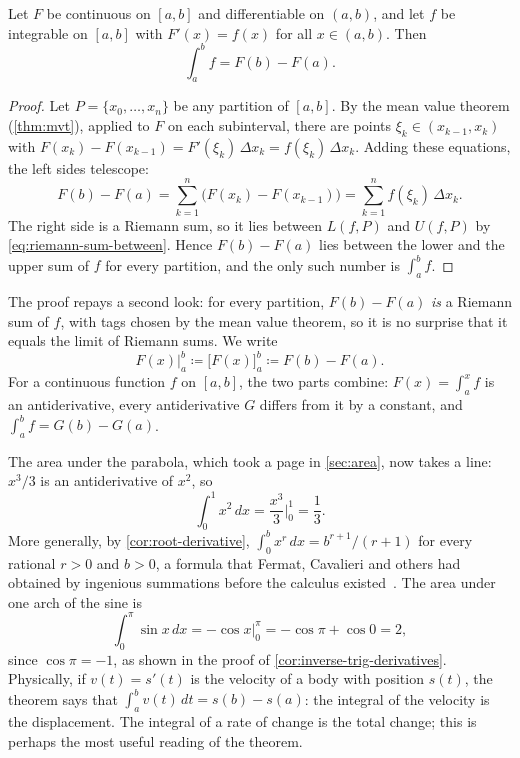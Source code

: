 \begin{theorem}
\label{thm:ftc2}
Let $F$ be continuous on $[a,b]$ and differentiable on $(a,b)$, and let $f$ be integrable on $[a,b]$ with $F'(x)=f(x)$ for all $x\in(a,b)$. Then
\[
\int_a^bf=F(b)-F(a).
\]
\end{theorem}

\begin{proof}
Let $P=\{x_0,\ldots,x_n\}$ be any partition of $[a,b]$. By the mean value theorem (\cref{thm:mvt}), applied to $F$ on each subinterval, there are points $\xi_k\in(x_{k-1},x_k)$ with $F(x_k)-F(x_{k-1})=F'(\xi_k)\,\Delta x_k=f(\xi_k)\,\Delta x_k$. Adding these equations, the left sides telescope:
\[
F(b)-F(a)=\sum_{k=1}^n\bigl(F(x_k)-F(x_{k-1})\bigr)=\sum_{k=1}^nf(\xi_k)\,\Delta x_k .
\]
The right side is a Riemann sum, so it lies between $L(f,P)$ and $U(f,P)$ by \eqref{eq:riemann-sum-between}. Hence $F(b)-F(a)$ lies between the lower and the upper sum of $f$ for every partition, and the only such number is $\int_a^bf$.
\end{proof}

The proof repays a second look: for every partition, $F(b)-F(a)$ \emph{is} a Riemann sum of $f$, with tags chosen by the mean value theorem, so it is no surprise that it equals the limit of Riemann sums. We write
\[
F(x)\Big|_a^b\coloneqq\bigl[F(x)\bigr]_a^b\coloneqq F(b)-F(a).
\]
For a continuous function $f$ on $[a,b]$, the two parts combine: $F(x)=\int_a^xf$ is an antiderivative, every antiderivative $G$ differs from it by a constant, and $\int_a^bf=G(b)-G(a)$.

The area under the parabola, which took a page in \cref{sec:area}, now takes a line: $x^3/3$ is an antiderivative of $x^2$, so
\[
\int_0^1x^2\,dx=\frac{x^3}3\Big|_0^1=\frac13 .
\]
More generally, by \cref{cor:root-derivative}, $\int_0^bx^r\,dx=b^{r+1}/(r+1)$ for every rational $r>0$ and $b>0$, a formula that Fermat, Cavalieri and others had obtained by ingenious summations before the calculus existed~\cite{edwards1979}. The area under one arch of the sine is
\[
\int_0^\pi\sin x\,dx=-\cos x\Big|_0^\pi=-\cos\pi+\cos0=2 ,
\]
since $\cos\pi=-1$, as shown in the proof of \cref{cor:inverse-trig-derivatives}. Physically, if $v(t)=s'(t)$ is the velocity of a body with position $s(t)$, the theorem says that $\int_a^bv(t)\,dt=s(b)-s(a)$: the integral of the velocity is the displacement. The integral of a rate of change is the total change; this is perhaps the most useful reading of the theorem.

